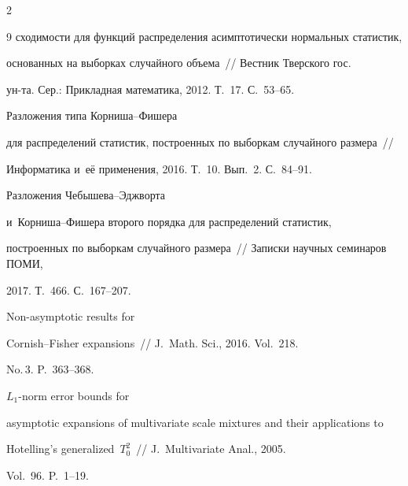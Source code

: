 \begin{multicols}{2}
{{\begin{thebibliography}{9}
сходимости для функций распределения асимптотически нормальных статистик, 


основанных на выборках случайного объема~// Вестник Тверского гос. 


ун-та. Сер.: Прикладная математика, 2012. Т.~17. С.~53--65.







 Разложения типа Кор\-ни\-ша--Фи\-ше\-ра 


для распределений статистик, построенных по выборкам случайного размера~//  


Информатика и~её применения, 2016. Т.~10. Вып.~2. С.~84--91.







 Разложения Че\-бы\-ше\-ва--Эдж\-вор\-та


 и~Кор\-ни\-ша--Фи\-ше\-ра второго порядка для распределений статистик, 


построенных по выборкам случайного размера~// Записки научных семинаров ПОМИ, 


2017. Т.~466. С.~167--207.







 Non-asymptotic results for 


Cornish--Fisher expansions~// J.~Math. Sci., 2016. Vol.~218. 


No.\,3. P.~363--368.







 $L_1$-norm error bounds for 


asymptotic expansions of multivariate scale mixtures and their applications to 


Hotelling's generalized~$T_0^2$~// J.~Multivariate Anal., 2005. 


Vol.~96. P.~1--19.














\end{thebibliography}}}
\end{multicols}
